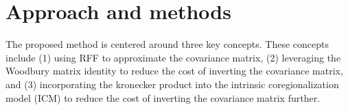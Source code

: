 \documentclass[11pt]{article}
\begin{document}







\section{Approach and methods}
\label{sec:methods}

The proposed method is centered around three key concepts. These concepts include (1) using RFF to approximate the covariance matrix, (2) leveraging the Woodbury matrix identity to reduce the cost of inverting the covariance matrix, and (3) incorporating the kronecker product into the intrinsic coregionalization model (ICM) to reduce the cost of inverting the covariance matrix further.
\end{document}
